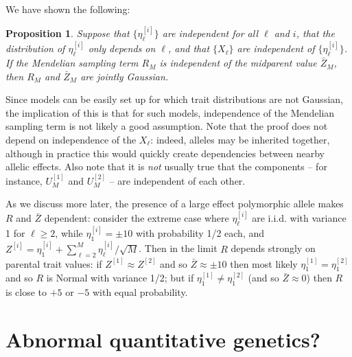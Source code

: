 \documentclass{article}
\newcommand{\1}{\mathbbm{1}}
\newtheorem{prop}{Proposition}
\theoremstyle{remark}
\theoremstyle{definition}
\begin{document}
We have shown the following:

\begin{prop}\label{prop:parental_contribs}
    Suppose that $\{\eta_\ell^{[i]}\}$ are independent for all $\ell$ and $i$,
    that the distribution of $\eta_\ell^{[i]}$ only depends on $\ell$,
    and that $\{X_\ell\}$ are independent of $\{\eta_\ell^{[i]}\}$.
    If the Mendelian sampling term $R_M$ is independent of the midparent value $\bar Z_M$,
    then $R_M$ and $\bar Z_M$ are jointly Gaussian.
\end{prop}


Since models can be easily set up for which trait distributions are not Gaussian,
the implication of this is that for such models, independence of the Mendelian sampling term
is not likely a good assumption.
Note that the proof does not depend on independence of the $X_\ell$:
indeed, alleles may be inherited together,
although in practice this would quickly create dependencies between nearby allelic effects.
Also note that it is \emph{not} usually true that the components --
for instance, $U_M^{[1]}$ and $U_M^{[2]}$ --
are independent of each other.

As we discuss more later,
the presence of a large effect polymorphic allele
makes $R$ and $\bar Z$ dependent:
consider the extreme case where $\eta^{[i]}_\ell$ are i.i.d.{} with variance 1 for $\ell \ge 2$,
while $\eta^{[i]}_1 = \pm 10$ with probability 1/2 each,
and $Z^{[i]} = \eta_1^{[i]} + \sum_{\ell=2}^M \eta_\ell^{[i]} / \sqrt{M}$.
Then in the limit $R$ depends strongly on parental trait values:
if $Z^{[1]} \approx Z^{[2]}$ and so $\bar Z \approx \pm 10$ then most likely
$\eta_1^{[1]} = \eta_1^{[2]}$ and so $R$ is Normal with variance 1/2;
but if $\eta_1^{[1]} \neq \eta_1^{[2]}$ (and so $\bar Z \approx 0$)
then $R$ is close to $+5$ or $-5$ with equal probability.


\section{Abnormal quantitative genetics?}
\end{document}
